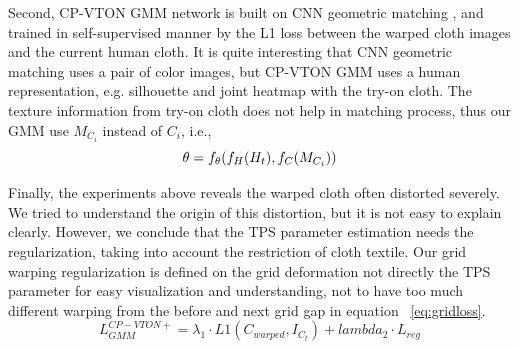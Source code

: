 Second, CP-VTON GMM network is built on CNN geometric matching \cite{rocco2017convolutional}, and trained in self-supervised manner by the L1 loss between the warped cloth images and the current human cloth. It is quite interesting that CNN geometric matching uses a pair of color images, but CP-VTON GMM uses a human representation, e.g. silhouette and joint heatmap with the try-on cloth. The texture information from try-on cloth does not help in matching process, thus our GMM use $M_{C_i}$ instead of $C_i$, i.e.,  
\[  
   \bold{\theta} = f_{\theta} ( f_H (H_t), f_C(M_{C_i}) )
\]


Finally, the experiments above reveals the warped cloth often distorted severely. We tried to understand the origin of this distortion, but it is not easy to explain clearly.  However, we conclude that the TPS parameter estimation needs the regularization, taking into account the restriction of cloth textile. Our grid warping regularization is defined on the grid deformation not directly the TPS parameter for easy visualization and understanding,  not to have too much different warping from the before and next grid gap in equation ~\ref{eq:gridloss}.
\begin{equation}
 L_{GMM}^{CP-VTON+}  = \lambda_1 \cdot L1(C_{warped}, I_{C_t}) + lambda_2 \cdot  L_{reg}  
\end{equation}







